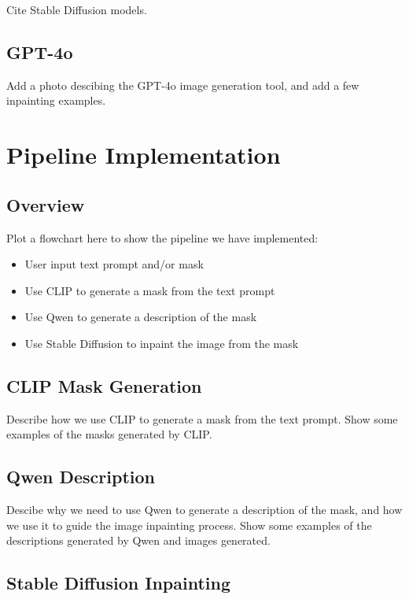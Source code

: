 \documentclass{article}
\begin{document}
Cite Stable Diffusion models.


\subsection{GPT-4o}


Add a photo descibing the GPT-4o image generation tool, and add a few inpainting examples.


\section{Pipeline Implementation}


\subsection{Overview}


Plot a flowchart here to show the pipeline we have implemented:


\begin{itemize}
    \item User input text prompt and/or mask
    \item Use CLIP to generate a mask from the text prompt
    \item Use Qwen to generate a description of the mask
    \item Use Stable Diffusion to inpaint the image from the mask
\end{itemize}


\subsection{CLIP Mask Generation}


Describe how we use CLIP to generate a mask from the text prompt. Show some examples of the masks generated by CLIP.


\subsection{Qwen Description}


Descibe why we need to use Qwen to generate a description of the mask, and how we use it to guide the image inpainting process. Show some examples of the descriptions generated by Qwen and images generated.


\subsection{Stable Diffusion Inpainting}
\end{document}
